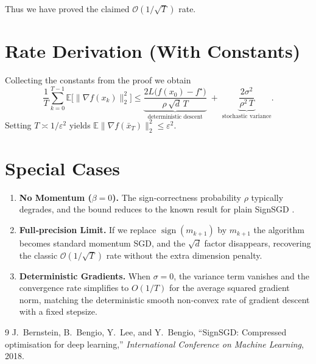 \documentclass{article}
\begin{document}
\bigskip
Thus we have proved the claimed $\mathcal{O}(1/\sqrt{T})$ rate.

\section*{Rate Derivation (With Constants)}
Collecting the constants from the proof we obtain
\[
\boxed{
\frac{1}{T}\sum_{k=0}^{T-1}\mathbb{E}\big[\|\nabla f(x_k)\|_2^2\big]
\le
\underbrace{\frac{2L\big(f(x_0)-f^\star\big)}{\rho\,\sqrt{d}\,T}}_{\text{deterministic descent}}
\;+\;
\underbrace{\frac{2\sigma^2}{\rho^2\,T}}_{\text{stochastic variance}} }.
\]
Setting $T\asymp 1/\varepsilon^2$ yields $\mathbb{E}\|\nabla f(\bar{x}_T)\|_2^2\le \varepsilon^2$.

\section*{Special Cases}
\begin{enumerate}
\item \textbf{No Momentum ($\beta=0$).} The sign‑correctness probability $\rho$ typically degrades, and the bound reduces to the known result for plain SignSGD \cite{bernstein2018signsgd}.
\item \textbf{Full‑precision Limit.} If we replace $\operatorname{sign}(m_{k+1})$ by $m_{k+1}$ the algorithm becomes standard momentum SGD, and the $\sqrt{d}$ factor disappears, recovering the classic $\mathcal{O}(1/\sqrt{T})$ rate without the extra dimension penalty.
\item \textbf{Deterministic Gradients.} When $\sigma=0$, the variance term vanishes and the convergence rate simplifies to $O(1/T)$ for the average squared gradient norm, matching the deterministic smooth non‑convex rate of gradient descent with a fixed stepsize.
\end{enumerate}

\begin{thebibliography}{9}
J.~Bernstein, B.~Bengio, Y.~Lee, and Y.~Bengio, ``SignSGD: Compressed optimisation for deep learning,'' \emph{International Conference on Machine Learning}, 2018.
\end{thebibliography}
\end{document}
